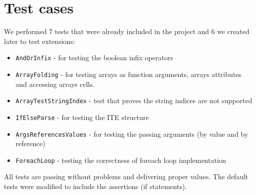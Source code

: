 \documentclass[10pt]{scrartcl}
\begin{document}
\section{Test cases}
We performed 7 tests that were already included in the project and 6 we created later to test extensions:
\begin{itemize}
\item \texttt{AndOrInfix} - for testing the boolean infix operators
\item \texttt{ArrayFolding} - for testing arrays as function arguments, arrays attributes and accessing arrays cells.
\item \texttt{ArrayTestStringIndex} - test that proves the string indices are not supported
\item \texttt{IfElseParse} - for testing the ITE structure
\item \texttt{ArgsReferencesValues} - for testing the passing arguments (by value and by reference)
\item \texttt{ForeachLoop} - testing the correctness of foreach loop implementation
\end{itemize}
All tests are passing without problems and delivering proper values. 
The default tests were modified to include the assertions (if statements).
\end{document}
